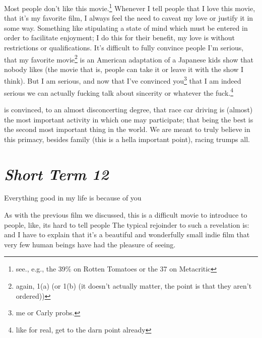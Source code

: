 \documentclass[../butidigress.tex]{subfiles}
\begin{document}
Most people don't like this movie.\footnote{see., e.g., the 39\% on Rotten Tomatoes or the 37 on Metacritic}
Whenever I tell people that I love this movie, that it's my favorite film, I always feel the need to caveat my love or justify it in some way.
Something like stipulating a state of mind which must be entered in order to facilitate enjoyment; I do this for their benefit, my love is without restrictions or qualifications.
It's difficult to fully convince people I'm serious, that my favorite movie\footnote{again, 1(a) (or 1(b) (it doesn't actually matter, the point is that they aren't ordered))} is an American adaptation of a Japanese kids show that nobody likes (the movie that is, people can take it or leave it with the show I think).
But I am serious, and now that I've convinced you\footnote{me or Carly probs.} that I am indeed serious we can actually fucking talk about sincerity or whatever the fuck.\footnote{like for real, get to the darn point already}

 is convinced, to an almost disconcerting degree, that race car driving is (almost) the most important activity in which one may participate; that being the best is the second most important thing in the world.
We are meant to truly believe in this primacy, besides family (this is a hella important point), racing trumps all.

\section{\textit{Short Term 12}}
\epigraph{Everything good in my life is because of you}{}

As with the previous film we discussed, this is a difficult movie to introduce to people, like, its hard to tell people 
The typical rejoinder to such a revelation is:  and I have to explain that it's a beautiful and wonderfully small indie film that very few human beings have had the pleasure of seeing.
\end{document}
